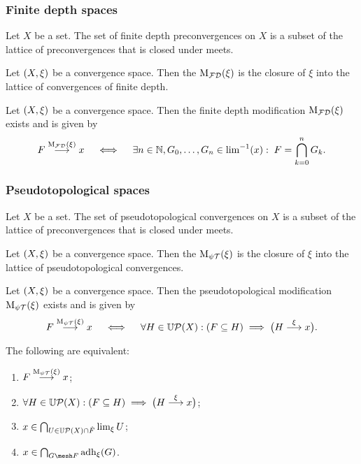 \subsubsection{Finite depth spaces}
\begin{lemma}
Let $X$ be a set. The set of finite depth preconvergences on $X$ is a subset of the lattice of preconvergences that is closed under meets.
\end{lemma}
\begin{definition}
Let $\sSet{X,\xi}$ be a convergence space. Then the  $\operatorname{M_\mathcal{FD}}(\xi)$ is the closure of $\xi$ into the lattice of convergences of finite depth.
\end{definition}

\begin{proposition}
Let $\sSet{X,\xi}$ be a convergence space. Then the finite depth modification $\operatorname{M_\mathcal{FD}}(\xi)$ exists and is given by
\[ F \overset{\operatorname{M_\mathcal{FD}}(\xi)}{\longrightarrow} x \quad\iff\quad \exists n\in\mathbb{N}, G_0,\ldots, G_n \in {\lim}^{-1}(x): \; F = \bigcap_{k=0}^n G_k. \]
\end{proposition}

\subsubsection{Pseudotopological spaces}
\begin{lemma}
Let $X$ be a set. The set of pseudotopological convergences on $X$ is a subset of the lattice of preconvergences that is closed under meets.
\end{lemma}
\begin{definition}
Let $\sSet{X,\xi}$ be a convergence space. Then the  $\operatorname{M_{\psi\mathcal{T}}}(\xi)$ is the closure of $\xi$ into the lattice of pseudotopological convergences.
\end{definition}

\begin{proposition} \label{pseudotopModConstruction}
Let $\sSet{X,\xi}$ be a convergence space. Then the pseudotopological modification $\operatorname{M_{\psi\mathcal{T}}}(\xi)$ exists and is given by
\[ F \overset{\operatorname{M_{\psi\mathcal{T}}}(\xi)}{\longrightarrow} x \quad\iff\quad \forall H\in \operatorname{\mathbb{U}\mathcal{P}}(X): (F\subseteq H) \implies \big(H \overset{\xi}{\longrightarrow} x\big). \]
\end{proposition}

\begin{proposition}
The following are equivalent:
\begin{enumerate}
\item $F \overset{\operatorname{M_{\psi\mathcal{T}}}(\xi)}{\longrightarrow} x$;
\item $\forall H\in \operatorname{\mathbb{U}\mathcal{P}}(X): (F\subseteq H) \implies \big(H \overset{\xi}{\longrightarrow} x\big)$;
\item $x\in \bigcap_{U\in \operatorname{\mathbb{U}\mathcal{P}}(X)\cap \dot{F}}\lim_\xi U$;
\item $x\in \bigcap_{G\mesh F}\adh_\xi(G)$.
\end{enumerate}
\end{proposition}

